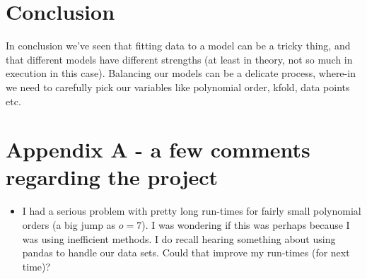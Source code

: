 \documentclass{article}
\begin{document}
\section{Conclusion}
In conclusion we've seen that fitting data to a model can be a tricky thing, and that different models have different strengths (at least in theory, not so much in execution in this case). Balancing our models can be a delicate process, where-in we need to carefully pick our variables like polynomial order, kfold, data points etc.


\section*{Appendix A - a few comments regarding the project}
\begin{itemize}
    \item I had a serious problem with pretty long run-times for fairly small polynomial orders (a big jump as $o = 7$). I was wondering if this was perhaps because I was using inefficient methods. I do recall hearing something about using pandas to handle our data sets. Could that improve my run-times (for next time)?
\end{itemize}
\end{document}

